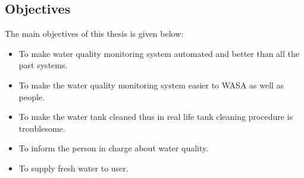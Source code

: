 


\subsection{Objectives}
The main objectives of this thesis is given below:
\begin{itemize}
    \item To make water quality monitoring system automated and better than all the past systems.
    \item To make the water quality monitoring system easier to WASA as well as people.
    \item To make the water tank cleaned thus in real life tank cleaning procedure is troublesome.
    \item To inform the person in charge about water quality.
    \item To supply fresh water to user.
\end{itemize}
 


